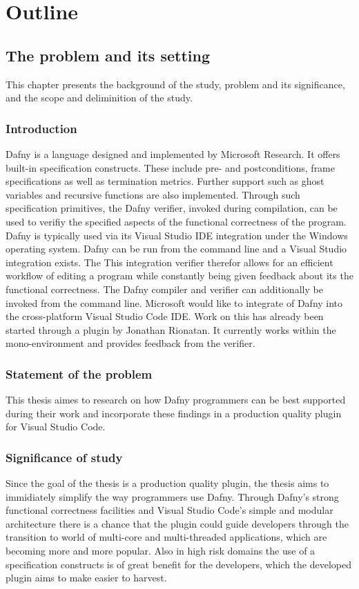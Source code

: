 \section{Outline}
\subsection{The problem and its setting}
This chapter presents the background of the study, problem and its significance, and the scope and deliminition of the study.
\subsubsection{Introduction}
Dafny is a language designed and implemented by Microsoft Research. It offers built-in specification constructs. These include pre- and postconditions, frame specifications as well as termination metrics. Further support such as ghost variables and recursive functions are also implemented. Through such specification primitives, the Dafny verifier, invoked during compilation, can be used to verifiy the specified aspects of the functional correctness of the program. \newline
Dafny is typically used via its Visual Studio  IDE integration under the Windows operating system. Dafny can be run from the command line and a Visual Studio integration exists. The This integration verifier therefor allows for an efficient workflow of editing a program while constantly being given feedback about its the functional correctness. The Dafny compiler and verifier can additionally be invoked from the command line. \newline
Microsoft would like to integrate of Dafny into the cross-platform Visual Studio Code IDE. Work on this has already been started through a plugin by Jonathan  Rionatan. It currently works within the mono-environment and provides feedback from the verifier. \newline

\subsubsection{Statement of the problem}
This thesis aimes to research on how Dafny programmers can be best supported during their work and incorporate these findings in a production quality plugin for Visual Studio Code. 
\subsubsection{Significance of study}
Since the goal of the thesis is a production quality plugin, the thesis aims to immidiately simplify the way programmers use Dafny. Through Dafny's strong functional correctness facilities and Visual Studio Code's simple and modular architecture there is a chance that the plugin could guide developers through the transition to world of multi-core and multi-threaded applications, which are becoming more and more popular. Also in high risk domains the use of a specification constructs is of great benefit for the developers, which the developed plugin aims to make easier to harvest.
